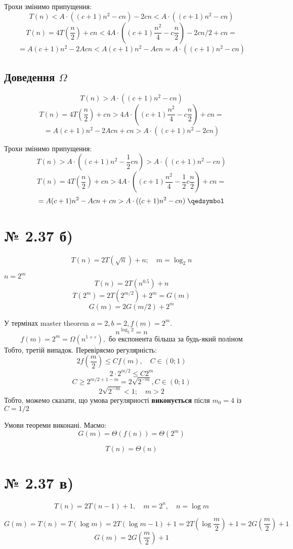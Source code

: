 \documentclass[11pt, a4paper]{article} %
\begin{document}
Трохи змінимо припущення:
$$T(n) < A \cdot ((c+1)n^2 - cn) - 2cn < A \cdot ((c+1)n^2 - cn)$$
$$T(n) = 4T(\frac{n}{2}) + cn < 4A \cdot ((c+1)\frac{n^2}{4} - c\frac{n}{2}) - 2cn/2 + cn = $$
$$= A(c+1)n^2 - 2Acn < A(c+1)n^2 - Acn = A\cdot ((c+1)n^2 - cn)$$
\qedsymbol

\subsection*{Доведення $\Omega$}
$$T(n) > A \cdot ((c+1)n^2 - cn)$$
$$T(n) = 4T(\frac{n}{2}) + cn > 4A \cdot ((c+1)\frac{n^2}{4} - c\frac{n}{2}) + cn = $$
$$= A(c+1)n^2 - 2Acn + cn > A\cdot ((c+1)n^2 - 2cn)$$

Трохи змінимо припущення:
$$T(n) > A \cdot ((c+1)n^2 - \frac{1}{2}cn) >  A \cdot ((c+1)n^2 - cn)$$
$$T(n) = 4T(\frac{n}{2}) + cn > 4A \cdot ((c+1)\frac{n^2}{4} - \frac{1}{2}c\frac{n}{2}) + cn = $$
$$= A(c+1)n^2 - Acn + cn > A\cdot ((c+1)n^2 - cn)\; \qedsymbol$$

\section*{№ 2.37 б)}
$$T(n) = 2T(\sqrt n) + n; \quad m = \log_2 n$$

$n = 2^m$
$$T(n) = 2T(n^{0.5}) + n$$
$$T(2^m) = 2T(2^{m/2}) + 2^m = G(m)$$
$$G(m) = 2G(m/2) + 2^m$$

У термінах master theorem $a=2,  b=2, f(m)=2^m$.
$$n^{\log_2 2} = n$$
$$f(m) = 2^m = \Omega(n^{1+\varepsilon}), \text{ бо експонента більша за будь-який поліном}$$
Тобто, третій випадок. Перевіряємо регулярність:
$$2f(\frac{m}{2}) \le C f(m), \quad C\in(0;1)$$
$$2\cdot 2^{m/2} \le C 2^m$$
$$C \ge 2^{m/2 + 1 - m} = 2\sqrt{2^{-m}}, C \in (0;1)$$
$$2\sqrt{2^{-m}} < 1;\quad m > 2$$
Тобто, можемо сказати, що умова регулярності \textbf{виконується} після $m_0 = 4$ із $C = 1/2$

Умови теореми виконані. Маємо:
$$G(m) = \Theta(f(n)) = \Theta(2^m)$$
\begin{mdframed}[style=ans]
    $$T(n) = \Theta(n)$$
\end{mdframed}

\section*{№ 2.37 в)}
$$T(n) = 2T(n-1) + 1, \quad m = 2^n, \quad n = \log m$$

$$G(m) = T(n) = T(\log m) = 2T(\log m-1) + 1 = 2T(\log \frac{m}{2}) + 1 = 2G(\frac{m}{2}) + 1$$
$$G(m) = 2G(\frac{m}{2}) + 1$$
\end{document}
